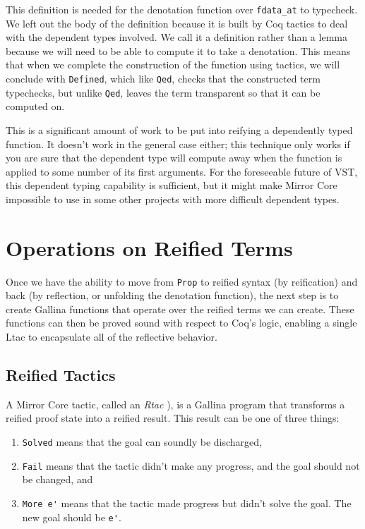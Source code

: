 \documentclass{puthesis}
\begin{document}
This definition is needed for the denotation function over
\lstinline|fdata_at| to typecheck.
We left out the body of the definition because it is built by Coq
tactics to deal with the dependent types involved. We call it a
definition rather than a lemma because we will need to be able to
compute it to take a denotation. This means that when we complete the
construction of the function using tactics, we will conclude with 
\lstinline|Defined|, which like \lstinline|Qed|, checks that the
constructed term typechecks, but unlike \lstinline|Qed|, leaves the
term transparent so that it can be computed on.

This is a significant
amount of work to be put into reifying a dependently typed
function. It doesn't work in the general case either; this technique
only works if you are sure that the dependent type will compute away
when the function is applied to some number of its first
arguments. For the foreseeable future of VST, this dependent typing
capability is sufficient, but it might make Mirror Core impossible to
use in some other projects with more difficult dependent types.

\chapter{Operations on Reified Terms}

Once we have the ability to move from \lstinline|Prop| to reified
syntax (by reification) and back (by reflection, or unfolding the
denotation function), the next step is to create Gallina functions that
operate over the reified terms we can create. These functions can then
be proved sound with respect to Coq's logic, enabling a single Ltac to
encapsulate all of the reflective behavior.

\section{Reified Tactics}

A Mirror Core tactic, called an \emph{Rtac} \cite[chapter
  6]{malecha:thesis}), is a Gallina program that transforms a reified
proof state into a reified result. This result can be one of three things:

\begin{enumerate}
\item \lstinline|Solved| means
  that the goal can soundly be discharged,
\item \lstinline|Fail| means that the tactic didn't make any progress,
  and the goal should not be changed, and
\item \lstinline|More e'| means that the tactic made progress but
  didn't solve the goal. The new goal should be \lstinline|e'|.
\end{enumerate}
\end{document}
